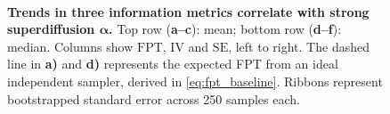 \begin{figure}[htbp]
  \centering
  \hfill
  \hfill
  \\[2pt]
  \hfill
  \hfill
  \caption{\textbf{Trends in three information metrics correlate with strong superdiffusion $\bm{\alpha}$.} Top row (\textbf{a--c}): mean; bottom row (\textbf{d--f}): median. Columns show $\mathrm{FPT}$, $\mathrm{IV}$ and $\mathrm{SE}$, left to right. The dashed line in \textbf{a)} and \textbf{d)} represents the expected FPT from an ideal independent sampler, derived in \cref{eq:fpt_baseline}. Ribbons represent bootstrapped standard error across 250 samples each.}
  \label{fig:alpha_metrics}
\end{figure}